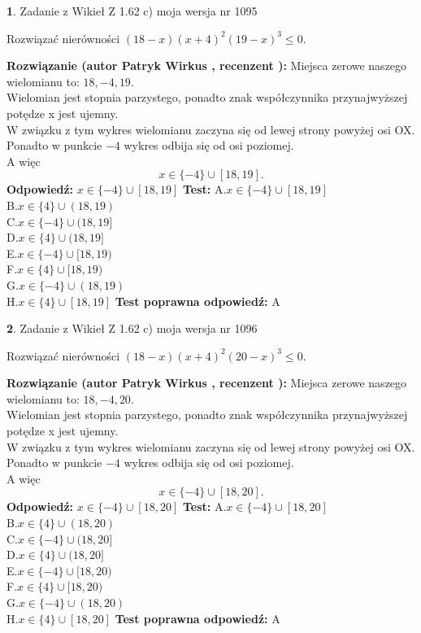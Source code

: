 \documentclass[12pt, a4paper]{article}
\theoremstyle{definition} %
\newtheorem{zad}{}
\newcommand{\zadStart}[1]{\begin{zad}#1\newline}
\newcommand{\zadStop}{\end{zad}}
\newcommand{\rozwStart}[2]{\noindent \textbf{Rozwiązanie (autor #1 , recenzent #2): }\newline}
\newcommand{\rozwStop}{\newline}
\newcommand{\odpStart}{\noindent \textbf{Odpowiedź:}\newline}
\newcommand{\odpStop}{\newline}
\newcommand{\testStart}{\noindent \textbf{Test:}\newline}
\newcommand{\testStop}{\newline}
\newcommand{\kluczStart}{\noindent \textbf{Test poprawna odpowiedź:}\newline}
\newcommand{\kluczStop}{\newline}
\begin{document}
\zadStart{Zadanie z Wikieł Z 1.62 c) moja wersja nr 1095}

Rozwiązać nierówności $(18-x)(x+4)^{2}(19-x)^{3}\le0$.
\zadStop
\rozwStart{Patryk Wirkus}{}
Miejsca zerowe naszego wielomianu to: $18, -4, 19$.\\
Wielomian jest stopnia parzystego, ponadto znak współczynnika przy\linebreak najwyższej potędze x jest ujemny.\\ W związku z tym wykres wielomianu zaczyna się od lewej strony powyżej osi OX.\\
Ponadto w punkcie $-4$ wykres odbija się od osi poziomej.\\
A więc $$x \in \{-4\} \cup [18,19].$$
\rozwStop
\odpStart
$x \in \{-4\} \cup [18,19]$
\odpStop
\testStart
A.$x \in \{-4\} \cup [18,19]$\\
B.$x \in \{4\} \cup (18,19)$\\
C.$x \in \{-4\} \cup (18,19]$\\
D.$x \in \{4\} \cup (18,19]$\\
E.$x \in \{-4\} \cup [18,19)$\\
F.$x \in \{4\} \cup [18,19)$\\
G.$x \in \{-4\} \cup (18,19)$\\
H.$x \in \{4\} \cup [18,19]$
\testStop
\kluczStart
A
\kluczStop



\zadStart{Zadanie z Wikieł Z 1.62 c) moja wersja nr 1096}

Rozwiązać nierówności $(18-x)(x+4)^{2}(20-x)^{3}\le0$.
\zadStop
\rozwStart{Patryk Wirkus}{}
Miejsca zerowe naszego wielomianu to: $18, -4, 20$.\\
Wielomian jest stopnia parzystego, ponadto znak współczynnika przy\linebreak najwyższej potędze x jest ujemny.\\ W związku z tym wykres wielomianu zaczyna się od lewej strony powyżej osi OX.\\
Ponadto w punkcie $-4$ wykres odbija się od osi poziomej.\\
A więc $$x \in \{-4\} \cup [18,20].$$
\rozwStop
\odpStart
$x \in \{-4\} \cup [18,20]$
\odpStop
\testStart
A.$x \in \{-4\} \cup [18,20]$\\
B.$x \in \{4\} \cup (18,20)$\\
C.$x \in \{-4\} \cup (18,20]$\\
D.$x \in \{4\} \cup (18,20]$\\
E.$x \in \{-4\} \cup [18,20)$\\
F.$x \in \{4\} \cup [18,20)$\\
G.$x \in \{-4\} \cup (18,20)$\\
H.$x \in \{4\} \cup [18,20]$
\testStop
\kluczStart
A
\kluczStop
\end{document}
